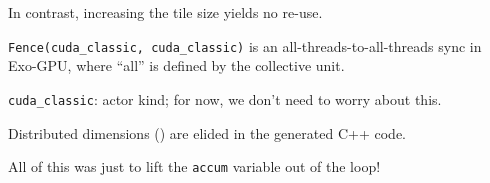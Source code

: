 In contrast, increasing the  tile size yields no re-use.


\newpage
{}



\texttt{Fence(cuda\_classic, cuda\_classic)} is an all-threads-to-all-threads sync in Exo-GPU, where ``all'' is defined by the collective unit.

\texttt{cuda\_classic}: actor kind; for now, we don't need to worry about this.

\newpage
{}



\newpage
{}



\newpage
{}



\newpage
{}



\newpage
{}



\newpage
{}



\newpage
{}



\newpage
{}


\newpage
{}

\begin{minipage}[t]{0.48\textwidth}\fixminipage
{}


\end{minipage}
\hfill
\begin{minipage}[t]{0.48\textwidth}\fixminipage
{}



\vspace{4mm}
Distributed dimensions () are elided in the generated C++ code.
\end{minipage}

All of this was just to lift the \texttt{accum} variable out of the loop!

